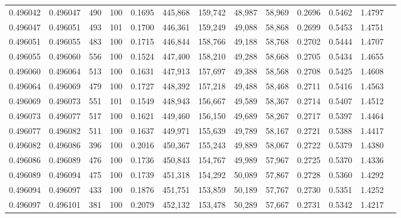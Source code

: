 \begin{tabular}{rrrrrrrrrrrrr}
0.496042 & 0.496047 &   490 & 100 &                                     0.1695 & 445,868 & 159,742 &  48,987 &  58,969 & 0.2696 & 0.5462 & 1.4797 \\
0.496047 & 0.496051 &   493 & 101 &                                     0.1700 & 446,361 & 159,249 &  49,088 &  58,868 & 0.2699 & 0.5453 & 1.4751 \\
0.496051 & 0.496055 &   483 & 100 &                                     0.1715 & 446,844 & 158,766 &  49,188 &  58,768 & 0.2702 & 0.5444 & 1.4707 \\
0.496055 & 0.496060 &   556 & 100 &                                     0.1524 & 447,400 & 158,210 &  49,288 &  58,668 & 0.2705 & 0.5434 & 1.4655 \\
0.496060 & 0.496064 &   513 & 100 &                                     0.1631 & 447,913 & 157,697 &  49,388 &  58,568 & 0.2708 & 0.5425 & 1.4608 \\
0.496064 & 0.496069 &   479 & 100 &                                     0.1727 & 448,392 & 157,218 &  49,488 &  58,468 & 0.2711 & 0.5416 & 1.4563 \\
0.496069 & 0.496073 &   551 & 101 &                                     0.1549 & 448,943 & 156,667 &  49,589 &  58,367 & 0.2714 & 0.5407 & 1.4512 \\
0.496073 & 0.496077 &   517 & 100 &                                     0.1621 & 449,460 & 156,150 &  49,689 &  58,267 & 0.2717 & 0.5397 & 1.4464 \\
0.496077 & 0.496082 &   511 & 100 &                                     0.1637 & 449,971 & 155,639 &  49,789 &  58,167 & 0.2721 & 0.5388 & 1.4417 \\
0.496082 & 0.496086 &   396 & 100 &                                     0.2016 & 450,367 & 155,243 &  49,889 &  58,067 & 0.2722 & 0.5379 & 1.4380 \\
0.496086 & 0.496089 &   476 & 100 &                                     0.1736 & 450,843 & 154,767 &  49,989 &  57,967 & 0.2725 & 0.5370 & 1.4336 \\
0.496089 & 0.496094 &   475 & 100 &                                     0.1739 & 451,318 & 154,292 &  50,089 &  57,867 & 0.2728 & 0.5360 & 1.4292 \\
0.496094 & 0.496097 &   433 & 100 &                                     0.1876 & 451,751 & 153,859 &  50,189 &  57,767 & 0.2730 & 0.5351 & 1.4252 \\
0.496097 & 0.496101 &   381 & 100 &                                     0.2079 & 452,132 & 153,478 &  50,289 &  57,667 & 0.2731 & 0.5342 & 1.4217 \\

\end{tabular}
